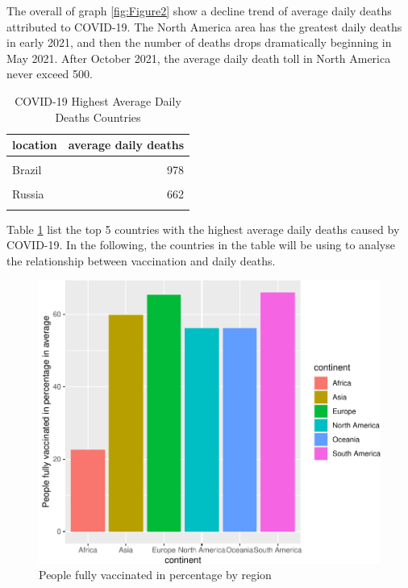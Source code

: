 \documentclass[11pt,a4paper,]{article}
\begin{document}
The overall of graph \ref{fig:Figure2} show a decline trend of average daily deaths attributed to COVID-19. The North America area has the greatest daily deaths in early 2021, and then the number of deaths drops dramatically beginning in May 2021. After October 2021, the average daily death toll in North America never exceed 500.

\begin{table}[!h]

\caption{\label{tab:Table2}COVID-19 Highest Average Daily Deaths Countries}
\centering
\begin{tabular}[t]{l|r}
\hline
location & average daily deaths\\
\hline
\cellcolor{gray!6}{United States} & \cellcolor{gray!6}{1201}\\
\hline
Brazil & 978\\
\hline
\cellcolor{gray!6}{India} & \cellcolor{gray!6}{798}\\
\hline
Russia & 662\\
\hline
\cellcolor{gray!6}{Mexico} & \cellcolor{gray!6}{396}\\
\hline
\end{tabular}
\end{table}

Table \ref{tab:Table2} list the top 5 countries with the highest average daily deaths caused by COVID-19.
In the following, the countries in the table will be using to analyse the relationship between vaccination and daily deaths.

\begin{figure}

{\centering \includegraphics{report_files/figure-latex/Figure3-1} 

}

\caption{People fully vaccinated in percentage by region}\label{fig:Figure3}
\end{figure}
\end{document}
